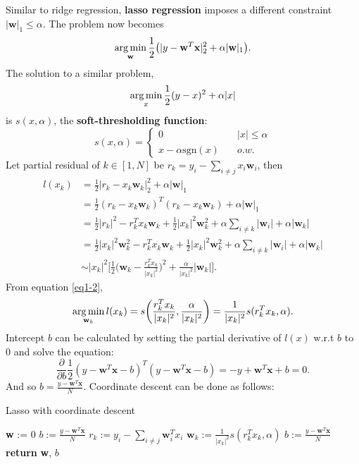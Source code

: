 \documentclass[../main.tex]{subfiles}
\begin{document}
\setlength{\parindent}{0pt}

Similar to ridge regression, \textbf{lasso regression} imposes a different constraint $|\textbf{w}|_1 \leq \alpha$. The problem now becomes $$\operatorname*{arg\,min}_{\textbf{w}}\frac{1}{2}\big(|y-\textbf{w}^T\textbf{x}|^2_2+\alpha|\textbf{w}|_1\big).$$
The solution to a similar problem, $$\operatorname*{arg\,min}_x\frac{1}{2}(y-x)^2+\alpha|x|$$ is $s(x, \alpha)$, the \textbf{soft-thresholding function}:
\begin{equation} \label{eq1-2}
s(x, \alpha) = \left\{
        \begin{array}{ll}
            0 & \quad |x| \leq \alpha \\
            x-\alpha \text{sgn}(x) & \quad o.w.
        \end{array}
    \right.
\end{equation}
Let partial residual of $k\in [1, N]$ be $r_k=y_i-\sum_{i\neq j}x_i\textbf{w}_i$, then
\begin{equation} \label{eq1-3}
\begin{split}
l(x_k) & = \frac{1}{2}|r_k-x_k\textbf{w}_k|^2_2+\alpha|\textbf{w}|_1 \\
 & = \frac{1}{2}(r_k-x_k\textbf{w}_k)^T(r_k-x_k\textbf{w}_k)+\alpha|\textbf{w}|_1 \\
 & = \frac{1}{2}|r_k|^2-r_k^Tx_k\textbf{w}_k+\frac{1}{2}|x_k|^2\textbf{w}_k^2+\alpha\sum_{i\neq k}|\textbf{w}_i|+\alpha|\textbf{w}_k| \\
 & = \frac{1}{2}|x_k|^2\textbf{w}_k^2-r_k^Tx_k\textbf{w}_k+\frac{1}{2}|x_k|^2\textbf{w}_k^2+\alpha\sum_{i\neq k}|\textbf{w}_i|+\alpha|\textbf{w}_k| \\
 & \sim |x_k|^2\bigg[\frac{1}{2}\big(\textbf{w}_k-\frac{r_k^Tx_k}{|x_k|^2}\big)^2+\frac{\alpha}{|x_k|^2}|\textbf{w}_k| \bigg].
\end{split}
\end{equation}
From equation \ref{eq1-2}, $$\operatorname*{arg\,min}_{\textbf{w}_k}l(x_k)=s\bigg(\frac{r_k^Tx_k}{|x_k|^2}, \frac{\alpha}{|x_k|^2}\bigg)=\frac{1}{|x_k|^2}s(r_k^Tx_k, \alpha).$$
Intercept $b$ can be calculated by setting the partial derivative of $l(x)$ w.r.t $b$ to 0 and solve the equation:
$$\frac{\partial}{\partial b}\frac{1}{2}(y-\textbf{w}^T\textbf{x}-b)^T(y-\textbf{w}^T\textbf{x}-b)=-y+\textbf{w}^T\textbf{x}+b=0.$$ And so $b=\frac{y-\textbf{w}^T\textbf{x}}{N}$.
Coordinate descent can be done as follows:
\smallskip\begin{algorithm}[H]
\caption{Lasso with coordinate descent}\label{lasso}
\begin{algorithmic}[5]
  \State \textbf{w} := 0
  \State $b:=\frac{y-\textbf{w}^T\textbf{x}}{N}$
    \State $r_k:=y_i-\sum_{i\neq j}\textbf{w}_i^Tx_i$
    \State $\textbf{w}_k:=\frac{1}{|x_k|^2}s(r_k^Tx_k, \alpha)$
    \State $b:=\frac{y-\textbf{w}^T\textbf{x}}{N}$
  \EndFor
  \State \textbf{return} \textbf{w}, $b$
\EndProcedure
\end{algorithmic}
\end{algorithm}\smallskip
\end{document}
